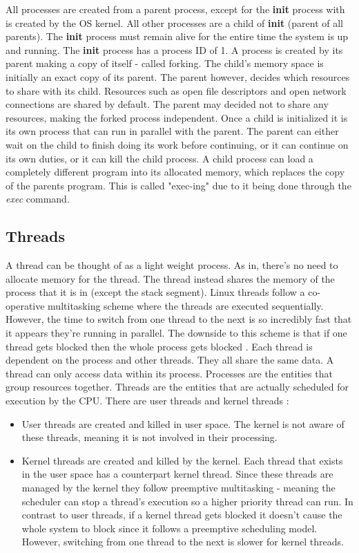 \documentclass[onecolumn,draftclsnofoot, 10pt, compsoc]{IEEEtran}
\def \ParSpace{\vspace{.75em}}
\begin{document}
	\ParSpace
	All processes are created from a parent process, except for the \textbf{init} process with is created by the OS kernel. 
	 All other processes are a child of \textbf{init}  (parent of all parents).
	 The \textbf{init}  process must remain alive for the entire time the system is up and running.
	 The \textbf{init} process has a process ID of 1. 
	 A process is created by its parent making a copy of itself - called forking.
	 The child's memory space is initially an exact copy of its parent.
	 The parent however, decides which resources to share with its child. Resources such as open file descriptors and open network connections are shared by default. The parent may decided not to share any resources, making the forked process independent.
	 Once a child is initialized it is its own process that can run in parallel with the parent. 
	 The parent can either wait on the child to finish doing its work before continuing, or it can continue on its own duties, or it can kill the child process.
	 A child process can load a completely different program into its allocated memory, which replaces the copy of the parents program. This is called "exec-ing" due to it being done through the \textit{exec} command. 
	 
 

\subsection{Threads}
	A thread can be thought of as a light weight process. 
	As in, there's no need to allocate memory for the thread. 
	The thread instead shares the memory of the process that it is in (except the stack segment).
	Linux threads follow a co-operative multitasking scheme where the threads are executed sequentially. 
	However, the time to switch from one thread to the next is so incredibly fast that it appears they're running in parallel. 
	The downside to this scheme is that if one thread gets blocked then the whole process gets blocked \cite{threadsVidLinux}.
	Each thread is dependent on the process and other threads. They all share the same data. A thread can only access data within its process.
	Processes are the entities that group resources together. Threads are the entities that are actually scheduled for execution by the CPU.
	There are user threads and kernel threads \cite{threadsArtiLinux}:
	\begin{itemize}
		\item User threads are created and killed in user space. 
		The kernel is not aware of these threads, meaning it is not involved in their processing.
		\item Kernel threads are created and killed by the kernel. 
		Each thread that exists in the user space has a counterpart kernel thread. 
		Since these threads are managed by the kernel they follow preemptive multitasking - meaning the scheduler can stop a thread's execution so a higher priority thread can run. 
		In contrast to user threads, if a kernel thread gets blocked it doesn't cause the whole system to block since it follows a preemptive scheduling model. 
		However, switching from one thread to the next is slower for kernel threads.
		
	\end{itemize}
	
\end{document}
